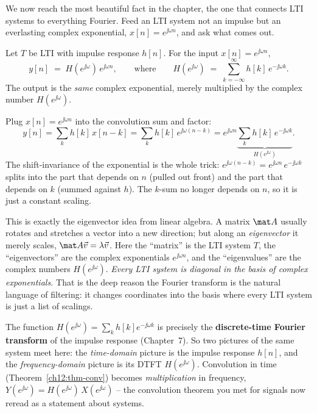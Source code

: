 We now reach the most beautiful fact in the chapter, the one that connects LTI
systems to everything Fourier. Feed an LTI system not an impulse but an
everlasting complex exponential, $x[n]=e^{\jj\omega n}$, and ask what comes out.

\begin{theorem}
\label{ch12:thm-eigen}
Let $T$ be LTI with impulse response $h[n]$. For the input $x[n]=e^{\jj\omega n}$,
\[
  y[n] \;=\; H(e^{\jj\omega})\,e^{\jj\omega n},
  \qquad\text{where}\qquad
  H(e^{\jj\omega}) \;=\; \sum_{k=-\infty}^{\infty} h[k]\,e^{-\jj\omega k}.
\]
The output is the \emph{same} complex exponential, merely multiplied by the
complex number $H(e^{\jj\omega})$.
\end{theorem}

\begin{whybox}
Plug $x[n]=e^{\jj\omega n}$ into the convolution sum and factor:
\[
  y[n] = \sum_{k} h[k]\,x[n-k]
       = \sum_{k} h[k]\,e^{\jj\omega(n-k)}
       = e^{\jj\omega n}\underbrace{\sum_{k} h[k]\,e^{-\jj\omega k}}_{H(e^{\jj\omega})}.
\]
The shift-invariance of the exponential is the whole trick: $e^{\jj\omega(n-k)} =
e^{\jj\omega n}\,e^{-\jj\omega k}$ splits into the part that depends on $n$
(pulled out front) and the part that depends on $k$ (summed against $h$). The
$k$-sum no longer depends on $n$, so it is just a constant scaling.
\end{whybox}

\begin{happeningbox}
This is exactly the eigenvector idea from linear algebra. A matrix $\mat A$
usually rotates and stretches a vector into a new direction; but along an
\emph{eigenvector} it merely scales, $\mat A\vec v=\lambda\vec v$. Here the
``matrix'' is the LTI system $T$, the ``eigenvectors'' are the complex
exponentials $e^{\jj\omega n}$, and the ``eigenvalues'' are the complex numbers
$H(e^{\jj\omega})$. \emph{Every LTI system is diagonal in the basis of complex
exponentials.} That is the deep reason the Fourier transform is the natural
language of filtering: it changes coordinates into the basis where every LTI
system is just a list of scalings.
\end{happeningbox}

\begin{connectionbox}
The function $H(e^{\jj\omega})=\sum_k h[k]e^{-\jj\omega k}$ is precisely the
\textbf{discrete-time Fourier transform} of the impulse response (Chapter~7). So
two pictures of the same system meet here: the \emph{time-domain} picture is the
impulse response $h[n]$, and the \emph{frequency-domain} picture is its DTFT
$H(e^{\jj\omega})$. Convolution in time (Theorem~\ref{ch12:thm-conv}) becomes
\emph{multiplication} in frequency, $Y(e^{\jj\omega})=H(e^{\jj\omega})\,
X(e^{\jj\omega})$ -- the convolution theorem you met for signals now reread as a
statement about systems.
\end{connectionbox}

